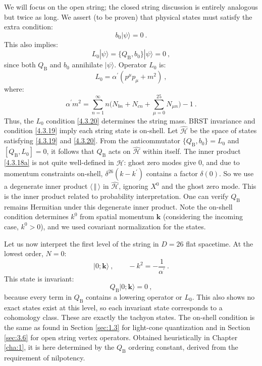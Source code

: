 We will focus on the open string; the closed string discussion is entirely analogous but twice as long. We assert (to be proven) that physical states must satisfy the extra condition:
\begin{equation}
b_{0}|\psi\rangle=0  \:. \label{4.3.19}
\end{equation}
This also implies:
\begin{equation}
L_{0}|\psi\rangle= \{Q_{\mathrm{B}}, b_{0} \}|\psi\rangle=0 \:, \label{4.3.20}
\end{equation}
since both $Q_{\mathrm{B}}$ and $b_{0}$ annihilate $|\psi\rangle$. Operator $L_{0}$ is:
\begin{equation}
L_{0}=\alpha^{\prime}(p^{\mu} p_{\mu}+m^{2}) \:, \label{4.3.21}
\end{equation}
where:
\begin{equation}
\alpha^{\prime} m^{2}=\sum_{n=1}^{\infty} n\Biggl(N_{b n}+N_{c n}+\sum_{\mu=0}^{25} N_{\mu n}\Biggr)-1 \:. \label{4.3.22}
\end{equation}
Thus, the $L_{0}$ condition \eqref{4.3.20} determines the string mass. BRST invariance and condition \eqref{4.3.19} imply each string state is on-shell. Let $\hat{\mathscr{H}}$ be the space of states satisfying \eqref{4.3.19} and \eqref{4.3.20}. From the anticommutator $\{Q_{\mathrm{B}}, b_{0}\}=L_{0}$ and $[Q_{\mathrm{B}}, L_{0}]=0$, it follows that $Q_{\mathrm{B}}$ acts on $\hat{\mathscr{H}}$ within itself. The inner product \eqref{4.3.18a} is not quite well-defined in $\hat{\mathscr{H}}$: ghost zero modes give 0, and due to momentum constraints on-shell, $\delta^{26}(k-k^{\prime})$ contains a factor $\delta(0)$. So we use a degenerate inner product $\langle \,\Vert \,\rangle$ in $\hat{\mathscr{H}}$, ignoring $X^{0}$ and the ghost zero mode. This is the inner product related to probability interpretation. One can verify $Q_{\mathrm{B}}$ remains Hermitian under this degenerate inner product. Note the on-shell condition determines $k^{0}$ from spatial momentum $\mathbf{k}$ (considering the incoming case, $k^{0}>0$), and we used covariant normalization for the states.

Let us now interpret the first level of the string in $D=26$ flat spacetime. At the lowest order, $N=0$:
\begin{equation}
|0 ; \mathbf{k}\rangle \:, \qquad-k^{2}=-\frac{1}{\alpha^{\prime}} \:. \label{4.3.23}
\end{equation}
This state is invariant:
\begin{equation}
Q_{\mathrm{B}}|0 ; \mathbf{k}\rangle=0 \:, \label{4.3.24}
\end{equation}
because every term in $Q_{\mathrm{B}}$ contains a lowering operator or $L_{0}$. This also shows no exact states exist at this level, so each invariant state corresponds to a cohomology class. These are exactly the tachyon states. The on-shell condition is the same as found in Section \ref{sec:1.3} for light-cone quantization and in Section \ref{sec:3.6} for open string vertex operators. Obtained heuristically in Chapter \ref{cha:1}, it is here determined by the $Q_{\mathrm{B}}$ ordering constant, derived from the requirement of nilpotency.

